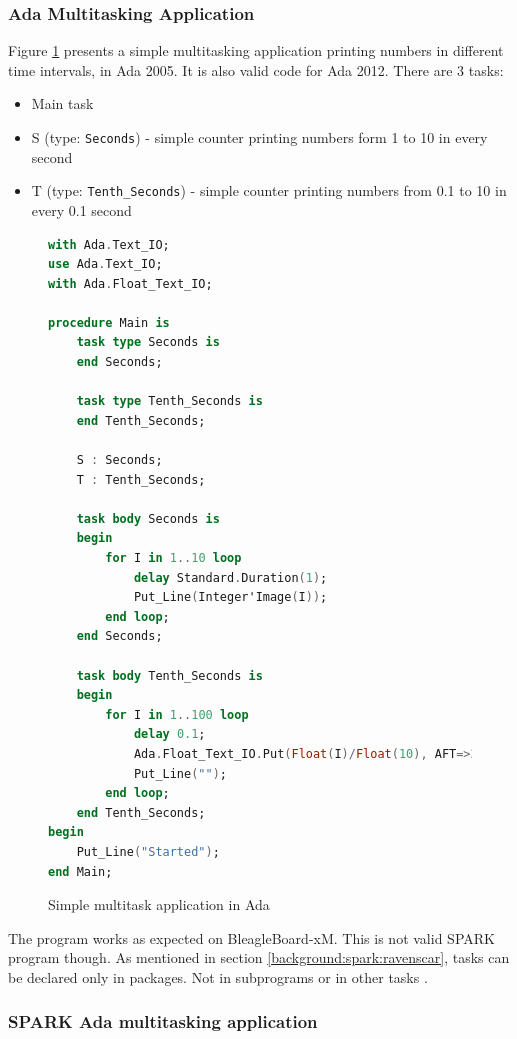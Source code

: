 \subsubsection{Ada Multitasking Application}

Figure \ref{listing:HelloTasking} presents a simple multitasking application printing numbers in different time intervals, in Ada 2005. It is also valid code for Ada 2012. There are 3 tasks:
\begin{itemize}
    \item Main task
    \item S (type: \lstinline{Seconds}) - simple counter printing numbers form 1 to 10 in every second
    \item T (type: \lstinline{Tenth_Seconds}) - simple counter printing numbers from 0.1 to 10 in every 0.1 second
\end{itemize}

\begin{figure}
\singlespacing
\begin{lstlisting}[language=ada, frame=single, gobble=0]
with Ada.Text_IO;
use Ada.Text_IO;
with Ada.Float_Text_IO;

procedure Main is
    task type Seconds is
    end Seconds;

    task type Tenth_Seconds is
    end Tenth_Seconds;

    S : Seconds;
    T : Tenth_Seconds;

    task body Seconds is
    begin
        for I in 1..10 loop
            delay Standard.Duration(1);
            Put_Line(Integer'Image(I));
        end loop;
    end Seconds;

    task body Tenth_Seconds is
    begin
        for I in 1..100 loop            
            delay 0.1;            
            Ada.Float_Text_IO.Put(Float(I)/Float(10), AFT=>2, EXP=>0);
            Put_Line("");
        end loop;
    end Tenth_Seconds;
begin
    Put_Line("Started");
end Main;
\end{lstlisting} 
\doublespacing
\caption{Simple multitask application in Ada}
\label{listing:HelloTasking}
\end{figure}

The program works as expected on BleagleBoard-xM. This is not valid SPARK program though. As mentioned in section \ref{background:spark:ravenscar}, tasks can be declared only in packages. Not in subprograms or in other tasks \cite{Barnes:Book}.

\subsubsection{SPARK Ada multitasking application}

